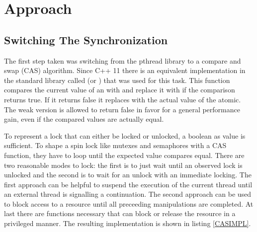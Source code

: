 

\chapter{Approach}

\section{Switching The Synchronization}
The first step taken was switching from the pthread library to a compare and swap (CAS) algorithm. Since C++ 11 there is an equivalent implementation in the standard library called  (or ) that was used for this task. This function compares the current value of an  with  and replace it with  if the comparison returns true. If it returns false it replaces  with the actual value of the atomic. The weak version is allowed to return false in favor for a general performance gain, even if the compared values are actually equal.

To represent a lock that can either be locked or unlocked, a boolean as value is sufficient. To shape a spin lock like mutexes and semaphores with a CAS function, they have to loop until the expected value compares equal. There are two reasonable modes to lock: the first is to just wait until an observed lock is unlocked and the second is to wait for an unlock with an immediate locking. The first approach can be helpful to suspend the execution of the current thread until an external thread is signalling a continuation. The second approach can be used to block access to a resource until all preceeding manipulations are completed. At last there are functions necessary that can block or release the resource in a privileged manner. The resulting implementation is shown in listing \ref{CASIMPL}.

